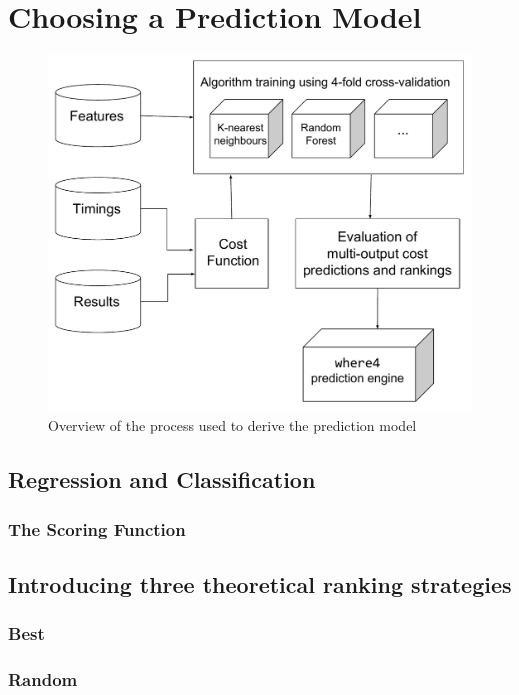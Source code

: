 \chapter{Choosing a Prediction Model}
\label{Prediction}

\begin{figure}
\centering
\includegraphics[width=0.9\linewidth]{Figures/Chapter4}
\caption{Overview of the process used to derive the  prediction model}
\label{fig:Chapter4}
\end{figure}


\section{Regression and Classification}

\subsection{The Scoring Function}
\label{sub:scoring}

\section{Introducing three theoretical ranking strategies}
\subsection{Best}
\subsection{Random}
